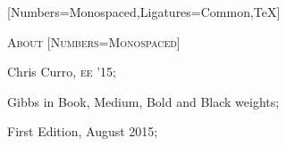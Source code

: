\documentclass{article}
\begin{document}
\begin{minipage}[t]{0.45\linewidth}
[Numbers=Monospaced,Ligatures={Common,TeX}]
\fontsize{9.5pt}{9.5pt}\selectfont
\upshape
\raggedright
\nocite{*}


\scshape \fontsize{16pt}{16pt}\selectfont {} About
[Numbers=Monospaced]
\fontsize{10pt}{10pt}\selectfont
\upshape
\raggedright

\begin{description}
\itemsep1pt
\item[Contributors:] Chris Curro, {\scshape ee '15}; 
\item[Typefaces:] Gibbs in Book, Medium, Bold and Black weights;
\item[Printing:] First Edition, August 2015;
\end{description}
\end{minipage}
\end{document}
